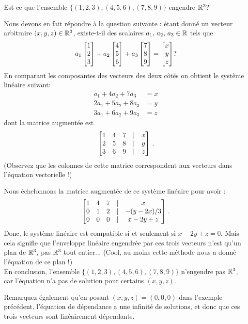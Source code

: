 \begin{myprob} Est-ce que l'ensemble $\{(1,2,3), (4,5,6), (7,8,9)\}$ engendre $\mathbb{R}^3$?

\begin{mysol} 
Nous devons en fait répondre à la question suivante : étant donné un vecteur arbitraire
$(x,y,z)\in\mathbb{R}^3$, existe-t-il des scalaires $a_1,\, a_2,\, a_3\in\mathbb{R}$ tels que
$$
a_1 \left[ \begin{matrix} 1\\2\\3 \end{matrix} \right] + a_2\left[ \begin{matrix} 4\\5\\6 \end{matrix} \right] + a_3 \left[ \begin{matrix} 7\\8\\9 \end{matrix} \right] = \left[ \begin{matrix} x\\y\\z \end{matrix} \right]?
$$
En comparant les composantes des vecteurs des deux c\^ot\'es on obtient le syst\`eme lin\'eaire suivant:
\begin{align*}
a_1 +4a_2 + 7a_3 &= x\\
2a_1+5a_2+ 8a_3 &=y\\
3a_1+6a_2 +9a_3 &= z
\end{align*}
dont la matrice augment\'ee est
$$
\left[ \begin{matrix} 1 & 4 & 7 &|& x\\
2 & 5 & 8 &|& y\\
3 & 6 & 9 &|& z \end{matrix} \right]\,.
$$
(Observez que les colonnes de cette matrice correspondent aux vecteurs dans
l'\'equation vectorielle !)

Nous \'echelonnons la matrice augment\'ee de ce système linéaire pour avoir  :
$$
\left[ \begin{matrix} 1 & 4 & 7 &|& x\\
0 & 1 & 2 &|& -(y-2x)/3\\
0 & 0 & 0 &|& x-2y+z
 \end{matrix} \right]\,.
$$
Donc, le système linéaire est compatible si et seulement si $x-2y+z=0$.
Mais cela signifie que l'enveloppe lin\'eaire engendr\'ee par ces trois vecteurs n'est qu'un plan de $\mathbb{R}^3$, pas $\mathbb{R}^3$ tout entier... (Cool, au moins cette méthode nous a donné l'équation de ce plan !)\\
En conclusion, l'ensemble $\{(1,2,3), (4,5,6), (7,8,9)\}$ n'engendre pas $\mathbb{R}^3$, car l'\'equation n'a pas de solution pour certains $(x,y,z)$.
\end{mysol}\end{myprob}

Remarquez également qu'en posant $(x,y,z)=(0,0,0)$ dans l'exemple précédent, l'équation de dépendance a une infinit\'e de solutions, et donc que ces trois vecteurs sont linéairement dépendants.





